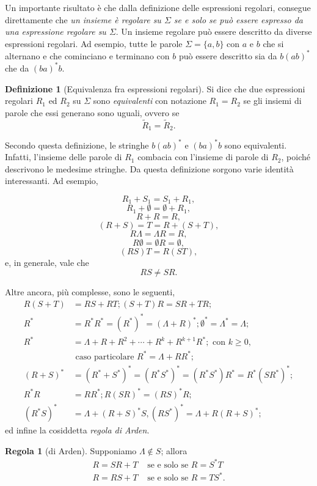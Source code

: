 \documentclass[10pt]{\classname}
\theoremstyle{newlinethm}
\theoremstyle{theorem}
\theoremstyle{definition}
\newtheorem{definizione}{Definizione}[section]
\theoremstyle{definition}
\newtheorem{regola}{Regola}[section]
\theoremstyle{definition}
\theoremstyle{definition}
\begin{document}
Un importante risultato è che dalla definizione delle espressioni regolari,
consegue direttamente che \emph{un insieme è regolare su $\Sigma$ se e solo se
può essere espresso da una espressione regolare su $\Sigma$}. Un insieme
regolare può essere descritto da diverse espressioni regolari. Ad esempio,
tutte le parole $\Sigma = \{a, b\}$ con $a$ e $b$ che si alternano e che
cominciano e terminano con $b$ può essere descritto sia da $b(ab)^*$ che da
$(ba)^* b$.

\begin{definizione}[Equivalenza fra espressioni regolari]
Si dice che due espressioni regolari $R_1$ ed $R_2$ su $\Sigma$ sono \emph{equivalenti} con notazione $R_1 = R_2$ se gli insiemi di parole che essi generano sono uguali, ovvero se \[\tilde R_1 = \tilde R_2.\]
\end{definizione}

Secondo questa definizione, le stringhe $b(ab)^*$ e $(ba)^* b$ sono equivalenti. Infatti, l'insieme delle parole di $R_1$ combacia con l'insieme di parole di $R_2$, poiché descrivono le medesime stringhe. Da questa definizione sorgono varie identità interessanti. Ad esempio,

\[  R_1 +  S_1 =  S_1 +  R_1,\]
\[  R_1 + \emptyset = \emptyset +  R_1,\]
\[  R +  R =  R,\]
\[ ( R +  S) =  T =  R + ( S +  T),\]
\[ R \Lambda  = \Lambda  R =  R,\]
\[ R \emptyset  = \emptyset  R = \emptyset,\]
\[( R  S)  T  =  R (  S  T),\]
e,  in generale, vale che
\[ R  S \neq  S  R.\]

Altre ancora, più complesse, sono le seguenti, 
\begin{align*}
    R(S + T) &= RS + RT;  (S + T)R = SR + TR; \\
    R^* &= R^* R^* = (R^*)^* = (\Lambda + R)^*; \emptyset^* = \Lambda^* = \Lambda; \\
    R^* &= \Lambda + R + R^2 + \cdots + R^k + R^{k+1}R^*; \mbox{ con } k \geq 0, \\
        &  \mbox{ caso particolare } R^* = \Lambda + RR^*; \\
    (R+S)^* &= (R^* + S^*)^* = (R^* S^*)^*  = (R^* S^*)R^* = R^*(SR^*)^*; \\
    R^* R &= RR^*;  R(SR)^* = (RS)^*R; \\
    (R^*S)^* &= \Lambda  + (R + S)^*S, (RS^*)^* =\Lambda + R(R + S)^*;
\end{align*}
ed infine la cosiddetta \emph{regola di Arden}.

\begin{regola}[di Arden] Supponiamo $\Lambda \notin S$; allora
    \begin{align*}
        R = SR + T & \mbox{ se e solo se } R = S^* T \\
        R = RS + T & \mbox{ se e solo se } R = T S^*.
    \end{align*}
\end{regola}
\end{document}
